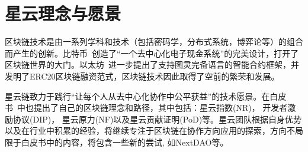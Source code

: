 \section{星云理念与愿景}
区块链技术是由一系列学科和技术（包括密码学，分布式系统，博弈论等）的组合而产生的创新。比特币~\cite{Nakamoto2008}创造了“⼀个去中⼼化电⼦现⾦系统”的完美设计，打开了区块链世界的大门。以太坊~\cite{buterin2013ethereum}进一步提出了支持图灵完备语言的智能合约框架，并发明了ERC20区块链融资范式，区块链技术因此取得了空前的繁荣和发展。

星云链致力于践行“让每个人从去中心化协作中公平获益”的技术愿景。在白皮书~\cite{TechWhitepaper}中也提出了自己的区块链理念和路径，其中包括：星云指数(NR)， 开发者激励协议(DIP)， 星云原力(NF)以及星云贡献证明(PoD)等。星云团队根据自身优势以及在行业中积累的经验，将继续专注于区块链在协作方向应用的探索，方向不局限于白皮书中的内容，将包含一些新的尝试, 如NextDAO等。
